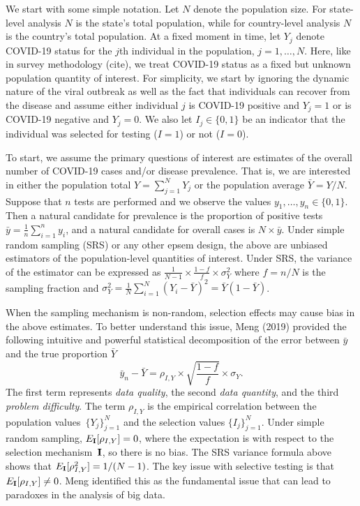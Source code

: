 \documentclass[11pt]{article}
\numberwithin{equation}{section}
\theoremstyle{plain}
\def\I{\bf I}
\begin{document}
We start with some simple notation.  Let $N$ denote the population size.  For state-level analysis $N$ is the state's total population, while for country-level analysis $N$ is the country's total population.  At a fixed moment in time, let $Y_j$ denote COVID-19 status for the $j$th individual in the population, $j=1,\ldots, N$. Here, like in survey methodology (cite), we treat COVID-19 status as a fixed but unknown population quantity of interest. For simplicity, we start by ignoring the dynamic nature of the viral outbreak as well as the fact that individuals can recover from the disease and assume either individual $j$ is COVID-19 positive and $Y_j=1$ or is COVID-19 negative and $Y_j=0$. We also let $I_j \in \{0,1\}$ be an indicator that the individual was selected for testing ($I = 1$) or not ($I=0$).

To start, we assume the primary questions of interest are estimates of the overall number of COVID-19 cases and/or disease prevalence. That is, we are interested in either the population total $Y = \sum_{j=1}^N Y_j$ or the population average $\bar Y = Y/N$. Suppose that $n$ tests are performed and we observe the values $y_1, \ldots, y_n \in \{0,1\}$.  Then a natural candidate for prevalence is the proportion of positive tests $\bar y = \frac{1}{n} \sum_{i=1}^n y_i$, and a natural candidate for overall cases is $N \times \bar y$.
Under simple random sampling (SRS) or any other epsem design, the above are unbiased estimators of the population-level quantities of interest.  Under SRS, the variance of the estimator can be expressed as $\frac{1}{N-1} \times \frac{1-f}{f} \times \sigma_Y^2$ where $f = n/N$ is the sampling fraction and $\sigma_Y^2 = \frac{1}{N} \sum_{i=1}^N (Y_i - \bar Y)^2 = \bar Y (1- \bar Y)$.

When the sampling mechanism is non-random, selection effects may cause bias in the above estimates. To better understand this issue, Meng (2019) provided the following intuitive and powerful statistical decomposition of the error between $\bar y$ and the true proportion $\bar Y$
$$
\bar y_n - \bar Y =  \rho_{I, Y} \times \sqrt{\frac{1-f}{f}} \times \sigma_Y.
$$
The first term represents \emph{data quality}, the second \emph{data quantity}, and the third \emph{problem difficulty}. The term $\rho_{I,Y}$ is the empirical correlation between the population values~$\{ Y_j \}_{j=1}^N$ and the selection values $\{ I_j \}_{j=1}^N$.  Under simple random sampling, $E_{\I} [ \rho_{I,Y} ] = 0$, where the expectation is with respect to the selection mechanism~$\I$, so there is no bias.  The SRS variance formula above shows that $E_{\I} [ \rho_{I,Y}^2 ]  = 1/(N-1)$.  The key issue with selective testing is that $E_{\I} [ \rho_{I,Y} ] \neq 0$.  Meng identified this as the fundamental issue that can lead to paradoxes in the analysis of big data.
\end{document}
